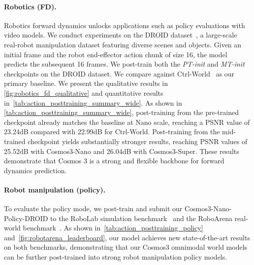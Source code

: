 \paragraph{Robotics (FD).}
\label{sec:robot_fdm}
Robotics forward dynamics unlocks applications such as policy evaluations with video models.
We conduct experiments on the DROID dataset~\citep{khazatsky2024droid}, a large-scale real-robot manipulation dataset featuring diverse scenes and objects. 
Given an initial frame and the robot end-effector action chunk of size 16, the model predicts the subsequent 16 frames.
We post-train both the \textit{PT-init} and \textit{MT-init} checkpoints on the DROID dataset.
We compare against Ctrl-World~\citep{guo2026ctrlworld} as our primary baseline.
We present the qualitative results in \cref{fig:robotics_fd_qualitative} and quantitative results in~\cref{tab:action_posttraining_summary_wide}.
As shown in \cref{tab:action_posttraining_summary_wide}, post-training from the pre-trained checkpoint already matches the baseline at Nano scale, reaching a PSNR value of 23.24dB compared with 22.99dB for Ctrl-World. 
Post-training from the mid-trained checkpoint yields substantially stronger results, reaching PSNR values of 25.52dB with Cosmos3-Nano and 26.04dB with Cosmos3-Super. 
These results demonstrate that Cosmos 3 is a strong and flexible backbone for forward dynamics prediction.


\paragraph{Robot manipulation (policy).}
\label{sec:robot_manip_policy}
To evaluate the policy mode, we post-train and submit our Cosmos3-Nano-Policy-DROID to the RoboLab simulation benchmark~\citep{yang2026robolab} and the RoboArena real-world benchmark~\citep{atreya2025roboarena}. 
As shown in~\cref{tab:action_posttraining_policy} and~\cref{fig:robotarena_leaderboard}, our model achieves new state-of-the-art results on both benchmarks, demonstrating that our Cosmos3 omnimodal world models can be further post-trained into strong robot manipulation policy models.

